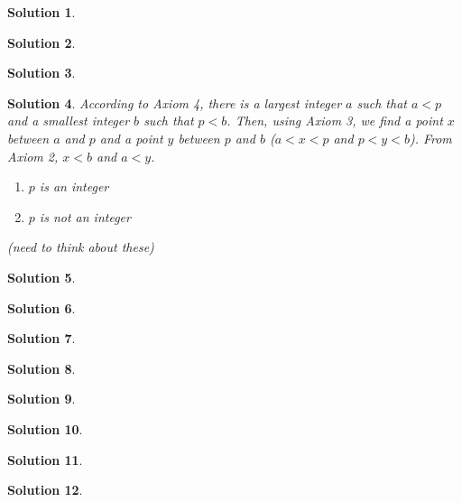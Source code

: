 \documentclass{article}
\newtheorem{solution}{Solution}
\begin{document}
\begin{solution} %
\end{solution}

\begin{solution}
\end{solution}

\begin{solution}
\end{solution}

\begin{solution} %
According to Axiom 4, there is a largest integer $a$ such that $a < p$ and a smallest integer $b$ such that $p < b$. Then, using Axiom 3, we find a point $x$ between $a$ and $p$ and a point $y$ between $p$ and $b$ ($a < x < p$ and $p < y < b$). From Axiom 2, $x < b$ and $a < y$.
\begin{enumerate}
\item
$p$ is an integer

\item
$p$ is not an integer

\end{enumerate}
(need to think about these)
\end{solution}

\begin{solution}
\end{solution}

\begin{solution}
\end{solution}

\begin{solution}
\end{solution}

\begin{solution}
\end{solution}

\begin{solution}
\end{solution}

\begin{solution}
\end{solution}

\begin{solution}
\end{solution}

\begin{solution}
\end{solution}
\end{document}
